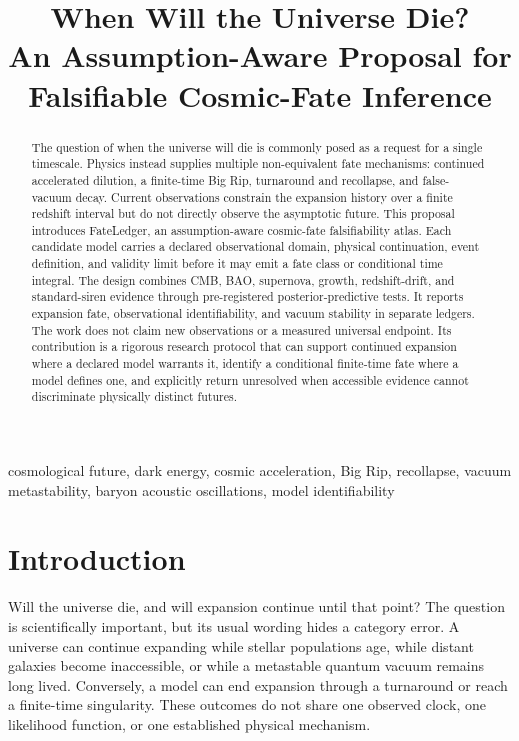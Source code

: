 \documentclass[conference]{IEEEtran}
\begin{document}
\title{When Will the Universe Die?\\
An Assumption-Aware Proposal for Falsifiable Cosmic-Fate Inference}
\author{
}
\maketitle

\begin{abstract}
The question of when the universe will die is commonly posed as a request for a single timescale. Physics instead supplies multiple non-equivalent fate mechanisms: continued accelerated dilution, a finite-time Big Rip, turnaround and recollapse, and false-vacuum decay. Current observations constrain the expansion history over a finite redshift interval but do not directly observe the asymptotic future. This proposal introduces FateLedger, an assumption-aware cosmic-fate falsifiability atlas. Each candidate model carries a declared observational domain, physical continuation, event definition, and validity limit before it may emit a fate class or conditional time integral. The design combines CMB, BAO, supernova, growth, redshift-drift, and standard-siren evidence through pre-registered posterior-predictive tests. It reports expansion fate, observational identifiability, and vacuum stability in separate ledgers. The work does not claim new observations or a measured universal endpoint. Its contribution is a rigorous research protocol that can support continued expansion where a declared model warrants it, identify a conditional finite-time fate where a model defines one, and explicitly return unresolved when accessible evidence cannot discriminate physically distinct futures.
\end{abstract}
\begin{IEEEkeywords}
cosmological future, dark energy, cosmic acceleration, Big Rip, recollapse, vacuum metastability, baryon acoustic oscillations, model identifiability
\end{IEEEkeywords}

\section{Introduction}

Will the universe die, and will expansion continue until that point? The question is scientifically important, but its usual wording hides a category error. A universe can continue expanding while stellar populations age, while distant galaxies become inaccessible, or while a metastable quantum vacuum remains long lived. Conversely, a model can end expansion through a turnaround or reach a finite-time singularity. These outcomes do not share one observed clock, one likelihood function, or one established physical mechanism.
\end{document}
